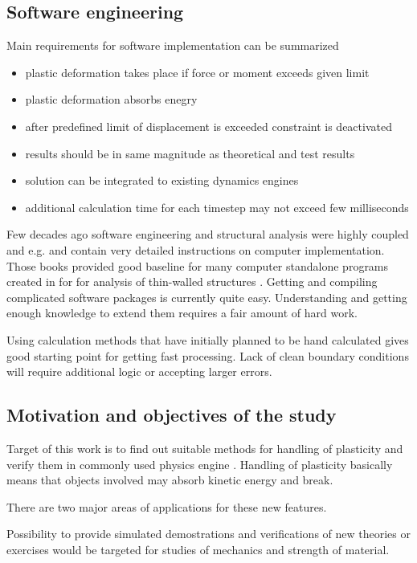 \subsection{Software engineering}

Main requirements for software implementation can be summarized
\begin{itemize}
\item plastic deformation takes place if force or moment exceeds given limit
\item plastic deformation absorbs enegry
\item after predefined limit of displacement is exceeded constraint is deactivated 
\item results should be in same magnitude as theoretical and test results
\item solution can be integrated to existing dynamics engines
\item additional calculation time for each timestep may not exceed few milliseconds 
\end{itemize}

Few decades ago software engineering and structural analysis were highly coupled
and e.g. \cite{bathe} and \cite{cook} contain very detailed instructions on
computer implementation. Those books provided good baseline for many computer 
standalone programs created in \lut for for analysis of 
thin-walled structures \cite{agifap,fsm,vtb}.  
Getting and compiling complicated software packages is currently quite easy. 
Understanding and getting enough knowledge to extend them requires a fair amount of hard work.

Using calculation methods that have initially planned to be hand calculated gives good starting point for 
getting fast processing. Lack of clean boundary conditions will require additional logic or accepting larger errors.


\subsection{Motivation and objectives of the study}

Target of this work is to find out suitable methods for handling of plasticity and verify them 
in commonly used physics engine \bullet. 
Handling of plasticity basically means that objects involved may absorb kinetic energy and break. 

There are two major areas of applications for these new features.

Possibility to provide simulated demostrations and verifications of new theories or exercises  would be targeted for 
studies of mechanics and strength of material. 
 
